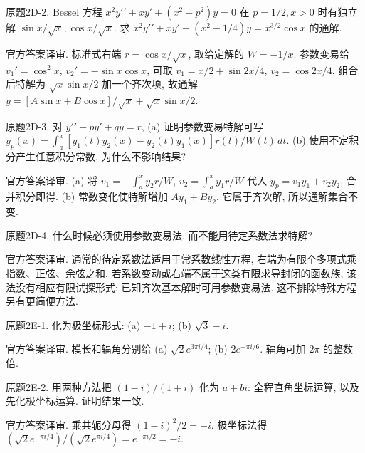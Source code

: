 \begin{exercise}\label{cw:bank-2D-2}
原题2D-2. Bessel 方程 $x^2y\prime\prime+xy\prime+(x^2-p^2)y=0$ 在 $p=1/2,x>0$ 时有独立解 $\sin x/\sqrt x,\cos x/\sqrt x$. 求 $x^2y\prime\prime+xy\prime+(x^2-1/4)y=x^{3/2}\cos x$ 的通解.
\end{exercise}
\begin{solution}
官方答案译审. 标准式右端 $r=\cos x/\sqrt x$, 取给定解的 $W=-1/x$. 参数变易给 $v_1\prime=\cos^2x$, $v_2\prime=-\sin x\cos x$, 可取 $v_1=x/2+\sin2x/4$, $v_2=\cos2x/4$. 组合后特解为 $\sqrt x\sin x/2$ 加一个齐次项, 故通解 $y=[A\sin x+B\cos x]/\sqrt x+\sqrt x\sin x/2$.
\end{solution}
\begin{exercise}\label{cw:bank-2D-3}
原题2D-3. 对 $y\prime\prime+py\prime+qy=r$, (a) 证明参数变易特解可写 $y_p(x)=\int_a^x [y_1(t)y_2(x)-y_2(t)y_1(x)]r(t)/W(t)\,dt$. (b) 使用不定积分产生任意积分常数, 为什么不影响结果?
\end{exercise}
\begin{solution}
官方答案译审. (a) 将 $v_1=-\int_a^x y_2r/W$, $v_2=\int_a^x y_1r/W$ 代入 $y_p=v_1y_1+v_2y_2$, 合并积分即得. (b) 常数变化使特解增加 $Ay_1+By_2$, 它属于齐次解, 所以通解集合不变.
\end{solution}
\begin{exercise}\label{cw:bank-2D-4}
原题2D-4. 什么时候必须使用参数变易法, 而不能用待定系数法求特解?
\end{exercise}
\begin{solution}
官方答案译审. 通常的待定系数法适用于常系数线性方程, 右端为有限个多项式乘指数、正弦、余弦之和. 若系数变动或右端不属于这类有限求导封闭的函数族, 该法没有相应有限试探形式; 已知齐次基本解时可用参数变易法. 这不排除特殊方程另有更简便方法.
\end{solution}
\begin{exercise}\label{cw:bank-2E-1}
原题2E-1. 化为极坐标形式: (a) $-1+i$; (b) $\sqrt3-i$.
\end{exercise}
\begin{solution}
官方答案译审. 模长和辐角分别给 (a) $\sqrt2e^{3\pi i/4}$; (b) $2e^{-\pi i/6}$. 辐角可加 $2\pi$ 的整数倍.
\end{solution}
\begin{exercise}\label{cw:bank-2E-2}
原题2E-2. 用两种方法把 $(1-i)/(1+i)$ 化为 $a+bi$: 全程直角坐标运算, 以及先化极坐标运算. 证明结果一致.
\end{exercise}
\begin{solution}
官方答案译审. 乘共轭分母得 $(1-i)^2/2=-i$. 极坐标法得 $(\sqrt2e^{-\pi i/4})/(\sqrt2e^{\pi i/4})=e^{-\pi i/2}=-i$.
\end{solution}
